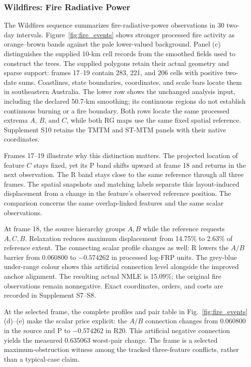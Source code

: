 \subsubsection{Wildfires: Fire Radiative Power}
The Wildfires sequence summarizes fire-radiative-power observations in 30 two-day intervals. Figure~\ref{fig:fire_events} shows stronger processed fire activity as orange--brown bands against the pale lower-valued background. Panel (c) distinguishes the supplied 10-km cell records from the smoothed fields used to construct the trees. The supplied polygons retain their actual geometry and sparse support: frames 17--19 contain 283, 221, and 206 cells with positive two-date sums. Coastlines, state boundaries, coordinates, and scale bars locate them in southeastern Australia. The lower row shows the unchanged analysis input, including the declared 50.7-km smoothing; its continuous regions do not establish continuous burning or a fire boundary. Both rows locate the same processed extrema $A$, $B$, and $C$, while both RG maps use the same fixed spatial reference. Supplement S10 retains the TMTM and ST-MTM panels with their native coordinates.

Frames 17--19 illustrate why this distinction matters. The projected location of feature $C$ stays fixed, yet its P band shifts upward at frame 18 and returns in the next observation. The R band stays close to the same reference through all three frames. The spatial snapshots and matching labels separate this layout-induced displacement from a change in the feature's observed reference position. The comparison concerns the same overlap-linked features and the same scalar observations.

At frame 18, the source hierarchy groups $A,B$ while the reference requests $A,C,B$. Relaxation reduces maximum displacement from 14.75\% to 2.63\% of reference extent. The connecting scalar profile changes as well: R lowers the $A/B$ barrier from 0.060800 to $-0.574262$ in processed log-FRP units. The grey-blue under-range colour shows this artificial connection level alongside the improved anchor alignment. The resulting actual NMLE is 15.09\%; the original fire observations remain nonnegative. Exact coordinates, orders, and costs are recorded in Supplement S7--S8.

At the selected frame, the complete profiles and pair table in Fig.~\ref{fig:fire_events}(d)--(e) make the scalar price explicit: the $A/B$ connection changes from 0.060800 in the source and P to $-0.574262$ in R20. This artificial negative connection yields the measured 0.635063 worst-pair change. The frame is a selected maximum-obstruction witness among the tracked three-feature conflicts, rather than a typical-case claim.
